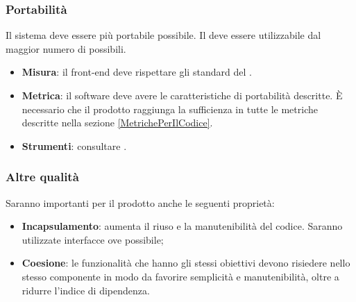 \documentclass[../PianoDiQualifica.tex]{subfiles}
\begin{document}
			\subsubsection{Portabilità}
				Il sistema deve essere più portabile possibile. Il 
				deve essere utilizzabile dal maggior numero di 
				possibili.
				\begin{itemize}
					\item \textbf{Misura}: il front-end deve rispettare gli
					standard del .
					\item \textbf{Metrica}: il software deve avere le
					caratteristiche di portabilità descritte. È necessario che il
					prodotto raggiunga la sufficienza in tutte le metriche
					descritte nella sezione \ref{MetrichePerIlCodice}.
					\item \textbf{Strumenti}: consultare \normediprogettov.	
				\end{itemize}
			\subsubsection{Altre qualità}
				Saranno importanti per il prodotto anche le seguenti proprietà:
				\begin{itemize}
					\item \textbf{Incapsulamento}: aumenta il riuso e la
					manutenibilità del codice. Saranno utilizzate interfacce ove
					possibile;
					\item \textbf{Coesione}: le funzionalità che hanno gli stessi
					obiettivi devono risiedere nello stesso componente in modo da
					favorire semplicità e manutenibilità, oltre a ridurre l'indice
					di dipendenza.
				\end{itemize}		
\end{document}
